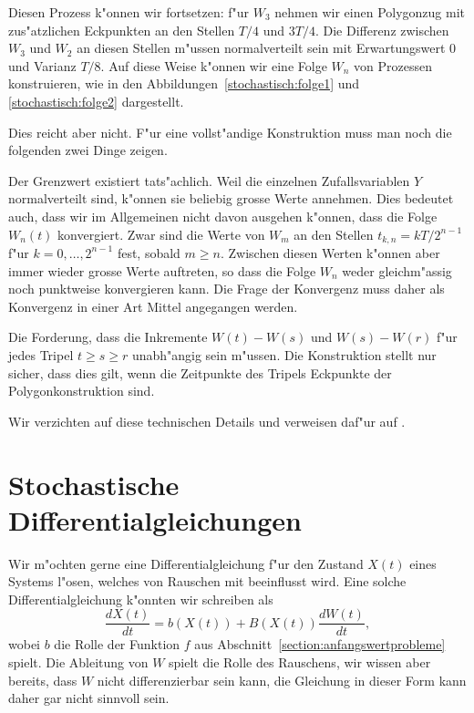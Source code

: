 Diesen Prozess k"onnen wir fortsetzen: f"ur $W_3$ nehmen wir einen
Polygonzug mit zus"atzlichen Eckpunkten an den Stellen $T/4$ und $3T/4$.
Die Differenz zwischen $W_3$ und $W_2$ an diesen Stellen m"ussen
normalverteilt sein mit Erwartungswert $0$ und Varianz $T/8$.
Auf diese Weise k"onnen wir eine Folge $W_n$ von Prozessen konstruieren,
wie in den Abbildungen~\ref{stochastisch:folge1} und \ref{stochastisch:folge2}
dargestellt.

Dies reicht aber nicht.
F"ur eine vollst"andige Konstruktion muss man noch die folgenden zwei
Dinge zeigen.
\begin{compactenum}
\item
Der Grenzwert existiert tats"achlich.
Weil die einzelnen Zufallsvariablen $Y$ normalverteilt sind, k"onnen
sie beliebig grosse Werte annehmen.
Dies bedeutet auch, dass wir im Allgemeinen nicht davon ausgehen 
k"onnen, dass die Folge $W_n(t)$ konvergiert.
Zwar sind die Werte von $W_m$ an den Stellen $t_{k,n}=kT/2^{n-1}$ f"ur
$k=0,\dots,2^{n-1}$ fest, sobald $m\ge n$.
Zwischen diesen Werten k"onnen aber immer wieder grosse Werte auftreten,
so dass die Folge $W_n$ weder gleichm"assig noch punktweise konvergieren
kann.
Die Frage der Konvergenz muss daher als Konvergenz in einer Art Mittel 
angegangen werden.
\item
Die Forderung, dass die Inkremente $W(t)-W(s)$ und $W(s)-W(r)$ f"ur jedes 
Tripel $t \ge s\ge r$ unabh"angig sein m"ussen.
Die Konstruktion stellt nur sicher, dass dies gilt, wenn die Zeitpunkte
des Tripels Eckpunkte der Polygonkonstruktion sind.
\end{compactenum}
Wir verzichten auf diese technischen Details und verweisen daf"ur
auf \cite{skript:evans}.

%
%
%
\section{Stochastische Differentialgleichungen\label{section:stochdgl}}
Wir m"ochten gerne eine Differentialgleichung f"ur den Zustand
$X(t)$ eines Systems l"osen, welches von Rauschen mit beeinflusst wird.
Eine solche Differentialgleichung k"onnten wir schreiben als
\[
\frac{dX(t)}{dt}
=
b(X(t)) + B(X(t))\frac{dW(t)}{dt},
\]
wobei $b$ die Rolle der Funktion $f$ aus
Abschnitt~\ref{section:anfangswertprobleme} spielt.
Die Ableitung von $W$ spielt die Rolle des Rauschens, wir wissen aber
bereits, dass $W$ nicht differenzierbar sein kann, die Gleichung
in dieser Form kann daher gar nicht sinnvoll sein.


